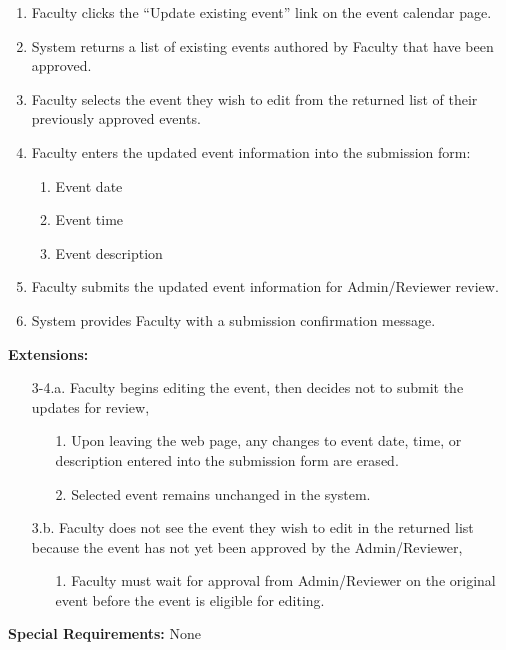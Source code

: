 \documentclass{article}
\begin{document}
    \begin{enumerate}
        \item Faculty clicks the “Update existing event” link on the event calendar page.
        \item System returns a list of existing events authored by Faculty that have been approved.
        \item Faculty selects the event they wish to edit from the returned list of their previously approved events.
        \item Faculty enters the updated event information into the submission form:
        \begin{enumerate}
            \item Event date 
            \item Event time 
            \item Event description  
        \end{enumerate}
        \item Faculty submits the updated event information for Admin/Reviewer review.
        \item System provides Faculty with a submission confirmation message.
    \end{enumerate}
    \textbf{Extensions:}
    \begin{enumerate}
        \item[3-4.a.] Faculty begins editing the event, then decides not to submit the updates for review,
        \begin{enumerate}
            \item[1.] Upon leaving the web page, any changes to event date, time, or description entered into the submission form are erased.
            \item[2.] Selected event remains unchanged in the system.
        \end{enumerate}
        \item [3.b.]  Faculty does not see the event they wish to edit in the returned list because the event has not yet been approved by the Admin/Reviewer,
        \begin{enumerate}
            \item[1.] Faculty must wait for approval from Admin/Reviewer on the original event before the event is eligible for editing.
        \end{enumerate}
    \end{enumerate}
    \textbf{Special Requirements:} None\\
    \\
\end{document}
